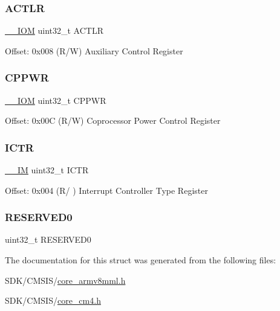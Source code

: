 \subsubsection{\texorpdfstring{A\+C\+T\+LR}{ACTLR}}
{\footnotesize\ttfamily \mbox{\hyperlink{core__cm4_8h_ab6caba5853a60a17e8e04499b52bf691}{\+\_\+\+\_\+\+I\+OM}} uint32\+\_\+t A\+C\+T\+LR}

Offset\+: 0x008 (R/W) Auxiliary Control Register \mbox{\label{struct_s_cn_s_c_b___type_a6236035fc90059a599910d9cb9299ff0}} 
\subsubsection{\texorpdfstring{C\+P\+P\+WR}{CPPWR}}
{\footnotesize\ttfamily \mbox{\hyperlink{core__cm4_8h_ab6caba5853a60a17e8e04499b52bf691}{\+\_\+\+\_\+\+I\+OM}} uint32\+\_\+t C\+P\+P\+WR}

Offset\+: 0x00C (R/W) Coprocessor Power Control Register \mbox{\label{struct_s_cn_s_c_b___type_acf9b76331abd768af25a10b3625da4b4}} 
\subsubsection{\texorpdfstring{I\+C\+TR}{ICTR}}
{\footnotesize\ttfamily \mbox{\hyperlink{core__cm4_8h_a4cc1649793116d7c2d8afce7a4ffce43}{\+\_\+\+\_\+\+IM}} uint32\+\_\+t I\+C\+TR}

Offset\+: 0x004 (R/ ) Interrupt Controller Type Register \mbox{\label{struct_s_cn_s_c_b___type_affae06cd6df5e9fe9a92994052fd3bec}} 
\subsubsection{\texorpdfstring{R\+E\+S\+E\+R\+V\+E\+D0}{RESERVED0}}
{\footnotesize\ttfamily uint32\+\_\+t R\+E\+S\+E\+R\+V\+E\+D0}



The documentation for this struct was generated from the following files\+:\begin{DoxyCompactItemize}
\item 
S\+D\+K/\+C\+M\+S\+I\+S/\mbox{\hyperlink{core__armv8mml_8h}{core\+\_\+armv8mml.\+h}}\item 
S\+D\+K/\+C\+M\+S\+I\+S/\mbox{\hyperlink{core__cm4_8h}{core\+\_\+cm4.\+h}}\end{DoxyCompactItemize}
